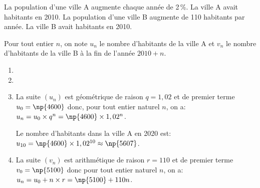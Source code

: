
\medskip

La population d'une ville A augmente chaque année de 2\,\%. 
La ville A avait  habitants en 2010.
La population d'une ville B augmente de 110 habitants par année.
La ville B avait  habitants en 2010.

Pour tout entier $n$, on note $u_n$ le nombre d'habitants de la ville A et $v_n$ le nombre d'habitants de la ville B à la fin de l'année $2010 + n$.

\medskip

\begin{enumerate}
\item%

\item%

\item %
La suite $(u_n)$ est géométrique de raison $q=1,02$ et de premier terme $u_0=\np{4600}$ donc, pour tout entier naturel $n$, on a: $u_n=u_0\times q^n = \np{4600}\times 1,02^n$.

Le nombre d'habitants dans la ville A en 2020 est: $u_{10}=\np{4600}\times 1,02^{10}\approx \np{5607}$.

\item %
La suite $(v_n)$ est arithmétique de raison $r=110$ et de premier terme $v_0=\np{5100}$ donc pour tout entier naturel $n$, on a:
$u_n=u_0 + n\times r = \np{5100} + 110n$.


\end{enumerate}
